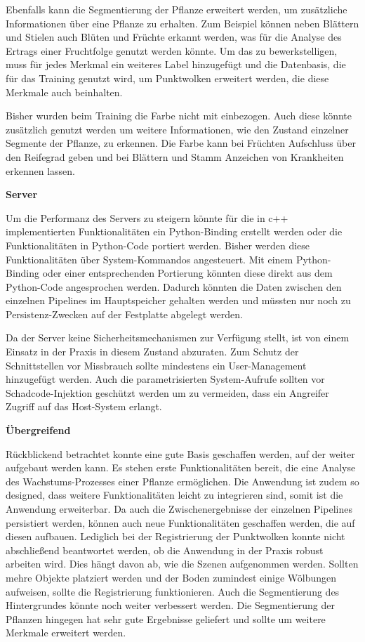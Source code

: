 \documentclass[12pt,titlepage, twoside]{article}
\begin{document}
Ebenfalls kann die Segmentierung der Pflanze erweitert werden, um zusätzliche Informationen über eine Pflanze zu erhalten. 
Zum Beispiel können neben Blättern und Stielen auch Blüten und Früchte erkannt werden, was für die Analyse des Ertrags einer Fruchtfolge genutzt werden könnte.
Um das zu bewerkstelligen, muss für jedes Merkmal ein weiteres Label hinzugefügt und die Datenbasis, die für das Training genutzt wird, 
um Punktwolken erweitert werden, die diese Merkmale auch beinhalten.

Bisher wurden beim Training die Farbe nicht mit einbezogen. Auch diese könnte zusätzlich genutzt werden um weitere Informationen, wie den Zustand einzelner Segmente der Pflanze, zu erkennen. 
Die Farbe kann bei Früchten Aufschluss über den Reifegrad geben und bei Blättern und Stamm Anzeichen von Krankheiten erkennen lassen.

\textbf{Server}

Um die Performanz des Servers zu steigern könnte für die in c++ implementierten Funktionalitäten ein Python-Binding erstellt werden oder die Funktionalitäten in Python-Code portiert werden. 
Bisher werden diese Funktionalitäten über System-Kommandos angesteuert. 
Mit einem Python-Binding oder einer entsprechenden Portierung könnten diese direkt aus dem Python-Code angesprochen werden. 
Dadurch könnten die Daten zwischen den einzelnen Pipelines im Hauptspeicher gehalten werden und müssten nur noch zu Persistenz-Zwecken auf der Festplatte abgelegt werden.

Da der Server keine Sicherheitsmechanismen zur Verfügung stellt, ist von einem Einsatz in der Praxis in diesem Zustand abzuraten. 
Zum Schutz der Schnittstellen vor Missbrauch sollte mindestens ein User-Management hinzugefügt werden. 
Auch die parametrisierten System-Aufrufe sollten vor Schadcode-Injektion geschützt werden um zu vermeiden, dass ein Angreifer Zugriff auf das Host-System erlangt.

\textbf{Übergreifend}

Rückblickend betrachtet konnte eine gute Basis geschaffen werden, auf der weiter aufgebaut werden kann. Es stehen erste Funktionalitäten bereit, die eine Analyse des Wachstums-Prozesses einer Pflanze ermöglichen. 
Die Anwendung ist zudem so designed, dass weitere Funktionalitäten leicht zu integrieren sind, somit ist die Anwendung erweiterbar. 
Da auch die Zwischenergebnisse der einzelnen Pipelines persistiert werden, können auch neue Funktionalitäten geschaffen werden, die auf diesen aufbauen.
Lediglich bei der Registrierung der Punktwolken konnte nicht abschließend beantwortet werden, ob die Anwendung in der Praxis robust arbeiten wird.
Dies hängt davon ab, wie die Szenen aufgenommen werden. Sollten mehre Objekte platziert werden und der Boden zumindest einige Wölbungen aufweisen, sollte die Registrierung funktionieren.
Auch die Segmentierung des Hintergrundes könnte noch weiter verbessert werden.
Die Segmentierung der Pflanzen hingegen hat sehr gute Ergebnisse geliefert und sollte um weitere Merkmale erweitert werden.
\end{document}
